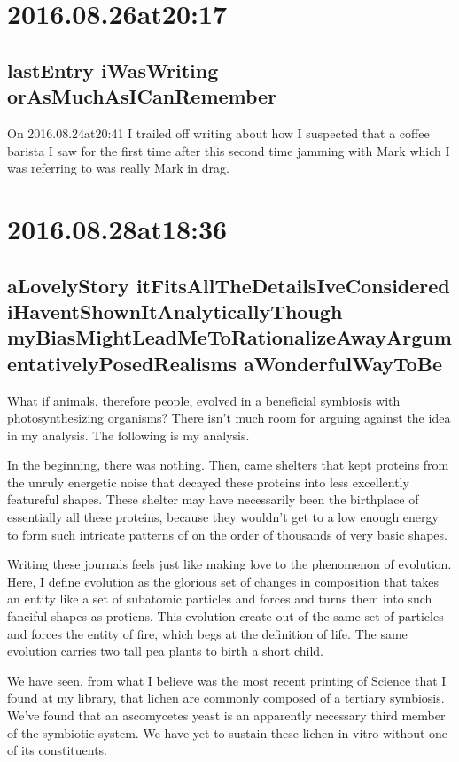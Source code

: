 \begin{enumerate}
\begin{enumerate}
\section*{ 2016.08.26at20:17 }
\subsection*{lastEntry iWasWriting orAsMuchAsICanRemember}
On 2016.08.24at20:41 I trailed off writing about how I suspected that a coffee barista I saw for the first time after this second time jamming with Mark which I was referring to was really Mark in drag.

\section*{ 2016.08.28at18:36 }
\subsection*{ aLovelyStory itFitsAllTheDetailsIveConsidered iHaventShownItAnalyticallyThough myBiasMightLeadMeToRationalizeAwayArgumentativelyPosedRealisms aWonderfulWayToBe }
What if animals, therefore people, evolved in a beneficial symbiosis with photosynthesizing organisms? There isn't much room for arguing against the idea in my analysis. The following is my analysis.

In the beginning, there was nothing. Then, came shelters that kept proteins from the unruly energetic noise that decayed these proteins into less excellently featureful shapes. These shelter may have necessarily been the birthplace of essentially all these proteins, because they wouldn't get to a low enough energy to form such intricate patterns of on the order of thousands of very basic shapes.

Writing these journals feels just like making love to the phenomenon of evolution. Here, I define evolution as the glorious set of changes in composition that takes an entity like a set of subatomic particles and forces and turns them into such fanciful shapes as protiens. This evolution create out of the same set of particles and forces the entity of fire, which begs at the definition of life. The same evolution carries two tall pea plants to birth a short child.

We have seen, from what I believe was the most recent printing of Science that I found at my library, that lichen are commonly composed of a tertiary symbiosis. We've found that an ascomycetes yeast is an apparently necessary third member of the symbiotic system.  We have yet to sustain these lichen in vitro without one of its constituents.


\end{enumerate}
\end{enumerate}
